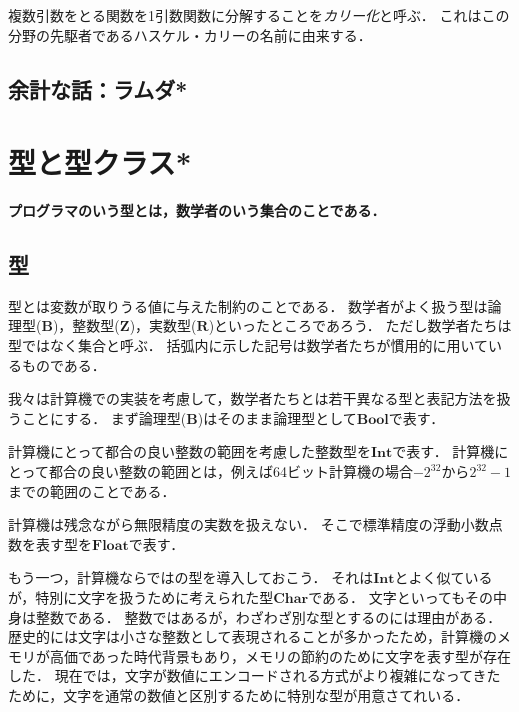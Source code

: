 \documentclass[twocolumn]{jsbook}
\newcommand{\hsklType}[1]{\textbf{#1}}
\newcommand{\hsklBool}{\hsklType{Bool}}
\newcommand{\hsklChar}{\hsklType{Char}}
\newcommand{\hsklInt}{\hsklType{Int}}
\newcommand{\hsklFloat}{\hsklType{Float}}
\newcommand{\mathSet}[1]{\mathbf{#1}}
\newcommand{\keyword}[1]{\emph{#1}}
\newenvironment{leader}{\begingroup\bf}{\endgroup}
\begin{document}
複数引数をとる関数を1引数関数に分解することを\keyword{カリー化}と呼ぶ．
これはこの分野の先駆者であるハスケル・カリーの名前に由来する．

\section*{余計な話：ラムダ*}


\chapter{型と型クラス*}

\begin{leader}
プログラマのいう型とは，数学者のいう集合のことである．
\end{leader}


\section{型}

型とは変数が取りうる値に与えた制約のことである．
数学者がよく扱う型は論理型($\mathSet{B}$)，整数型($\mathSet{Z}$)，実数型($\mathSet{R}$)といったところであろう．
ただし数学者たちは型ではなく集合と呼ぶ．
括弧内に示した記号は数学者たちが慣用的に用いているものである．

我々は計算機での実装を考慮して，数学者たちとは若干異なる型と表記方法を扱うことにする．
まず論理型($\mathSet{B}$)はそのまま論理型として$\hsklBool$で表す．

計算機にとって都合の良い整数の範囲を考慮した整数型を$\hsklInt$で表す．
計算機にとって都合の良い整数の範囲とは，例えば64ビット計算機の場合$-2^{32}$から$2^{32}-1$までの範囲のことである．

計算機は残念ながら無限精度の実数を扱えない．
そこで標準精度の浮動小数点数を表す型を$\hsklFloat$で表す．

もう一つ，計算機ならではの型を導入しておこう．
それは$\hsklInt$とよく似ているが，特別に文字を扱うために考えられた型$\hsklChar$である．
文字といってもその中身は整数である．
整数ではあるが，わざわざ別な型とするのには理由がある．
歴史的には文字は小さな整数として表現されることが多かったため，計算機のメモリが高価であった時代背景もあり，メモリの節約のために文字を表す型が存在した．
現在では，文字が数値にエンコードされる方式がより複雑になってきたために，文字を通常の数値と区別するために特別な型が用意さてれいる．
\end{document}
